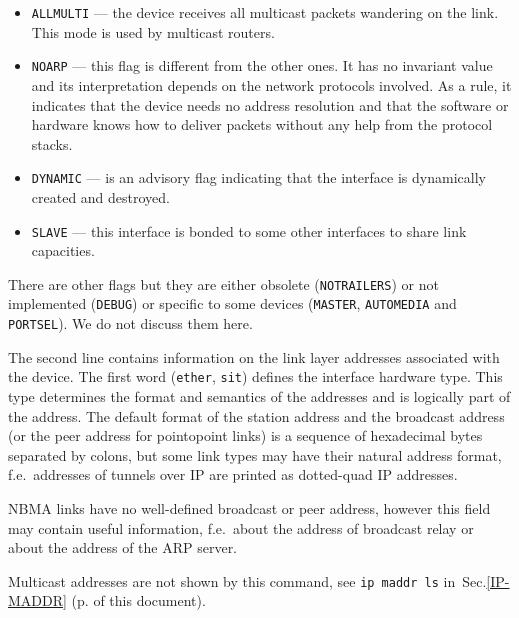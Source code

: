 \begin{itemize}
\item \verb|ALLMULTI| --- the device receives all multicast packets
wandering on the link. This mode is used by multicast routers.

\item \verb|NOARP| --- this flag is different from the other ones. It has
no invariant value and its interpretation depends on the network protocols
involved. As a rule, it indicates that the device needs no address
resolution and that the software or hardware knows how to deliver packets
without any help from the protocol stacks.

\item \verb|DYNAMIC| --- is an advisory flag indicating that the interface is
dynamically created and destroyed.

\item \verb|SLAVE| --- this interface is bonded to some other interfaces
to share link capacities.

\end{itemize}

\vskip 1mm
\begin{NB}
There are other flags but they are either obsolete (\verb|NOTRAILERS|)
or not implemented (\verb|DEBUG|) or specific to some devices
(\verb|MASTER|, \verb|AUTOMEDIA| and \verb|PORTSEL|). We do not discuss
them here.
\end{NB}


The second line contains information on the link layer addresses
associated with the device. The first word (\verb|ether|, \verb|sit|)
defines the interface hardware type. This type determines the format and semantics
of the addresses and is logically part of the address.
The default format of the station address and the broadcast address
(or the peer address for pointopoint links) is a
sequence of hexadecimal bytes separated by colons, but some link
types may have their natural address format, f.e.\ addresses
of tunnels over IP are printed as dotted-quad IP addresses.

\vskip 1mm
\begin{NB}
  NBMA links have no well-defined broadcast or peer address,
  however this field may contain useful information, f.e.\
  about the address of broadcast relay or about the address of the ARP server.
\end{NB}
\begin{NB}
Multicast addresses are not shown by this command, see
\verb|ip maddr ls| in~Sec.\ref{IP-MADDR} (p.\pageref{IP-MADDR} of this
document).
\end{NB}



